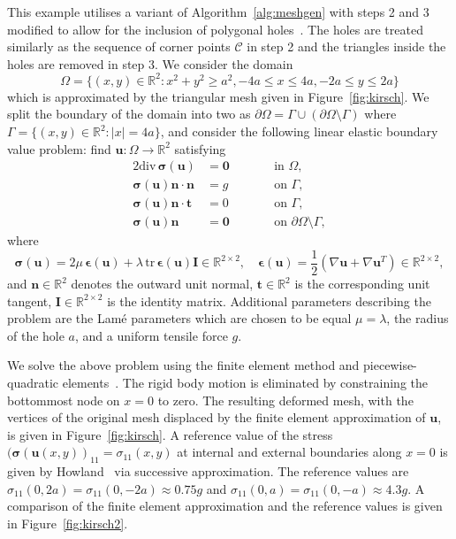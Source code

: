 \documentclass[12pt]{rmstyle}
\begin{document}
This example utilises a variant of Algorithm~\ref{alg:meshgen} with steps 2 and 3
modified to allow for the inclusion of polygonal holes~\cite{adaptmesh2020}.
The holes are treated similarly as the sequence of corner points $\mathcal{C}$ in step 2
and the triangles inside the holes are removed in step 3.
We consider the domain
\[
\Omega = \{ (x, y) \in \mathbb{R}^2 : x^2 + y^2 \geq a^2, -4a \leq x \leq 4a,-2a \leq y \leq 2a\}
\]
which is approximated by the triangular mesh given in Figure~\ref{fig:kirsch}.
We split the boundary of the domain into two as $\partial \Omega = \Gamma \cup (\partial \Omega \setminus \Gamma)$
where $\Gamma = \{ (x, y) \in \mathbb{R}^2 : |x|=4a \}$, and
consider the following linear elastic boundary value problem: find $\boldsymbol{u} : \Omega \rightarrow \mathbb{R}^2$ satisfying
\begin{alignat}{2}
  \mathrm{div}\,\boldsymbol{\sigma}(\boldsymbol{u}) &= \boldsymbol{0} \qquad &&\text{in $\Omega$},\\
  \boldsymbol{\sigma}(\boldsymbol{u})\boldsymbol{n} \cdot \boldsymbol{n} &= g \qquad &&\text{on $\Gamma$},\\
    \boldsymbol{\sigma}(\boldsymbol{u})\boldsymbol{n} \cdot \boldsymbol{t} &= 0 \qquad &&\text{on $\Gamma$},\\
  \boldsymbol{\sigma}(\boldsymbol{u})\boldsymbol{n} &= \boldsymbol{0} \qquad &&\text{on $\partial \Omega \setminus \Gamma$},
\end{alignat}
where
\[
\boldsymbol{\sigma}(\boldsymbol{u}) = 2 \mu\, \boldsymbol{\epsilon}(\boldsymbol{u}) + \lambda \,\mathrm{tr}\,\boldsymbol{\epsilon}(\boldsymbol{u}) \boldsymbol{I} \in \mathbb{R}^{2 \times 2}, \quad \boldsymbol{\epsilon}(\boldsymbol{u}) = \frac12\left(\nabla \boldsymbol{u} + \nabla \boldsymbol{u}^T\right) \in \mathbb{R}^{2 \times 2},
\]
and
$\boldsymbol{n} \in \mathbb{R}^2$ denotes the outward unit normal,
$\boldsymbol{t} \in \mathbb{R}^2$ is the corresponding unit tangent,
$\boldsymbol{I} \in \mathbb{R}^{2 \times 2}$ is the identity matrix.
Additional parameters describing the problem are the Lam\'{e} parameters
which are chosen to be equal
$\mu = \lambda$, the radius of the hole $a$, and a uniform tensile force
$g$.

We solve the above problem using the finite element method and piecewise-quadratic
elements~\cite{Verf_rth_2013}.
The rigid body motion is eliminated by constraining the bottommost node on $x=0$
to zero.
The resulting deformed mesh, with the vertices of the original mesh displaced by the finite element approximation of $\boldsymbol{u}$,
is given in Figure~\ref{fig:kirsch}.
A reference value of the stress $(\boldsymbol{\sigma}(\boldsymbol{u}(x, y))_{11} = \sigma_{11}(x, y)$
at internal and external boundaries along $x=0$
is given by \mbox{Howland~\cite{howland1930stresses}}
via successive approximation. The reference values are $\sigma_{11}(0, 2a) = \sigma_{11}(0, -2a) \approx 0.75 g$ and
$\sigma_{11}(0, a) = \sigma_{11}(0, -a) \approx 4.3 g$.
A comparison of the finite element approximation and the reference values
is given in Figure~\ref{fig:kirsch2}.
\end{document}
